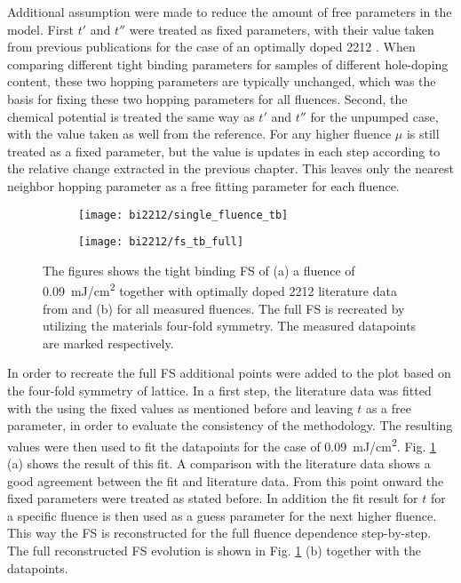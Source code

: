 Additional assumption were made to reduce the amount of free parameters in the model.
First $t'$ and $t''$ were treated as fixed parameters, with their value taken from previous publications for the case of an optimally doped 2212 \cite{}.
When comparing different tight binding parameters for samples of different hole-doping content, these two hopping parameters are typically unchanged, which was the basis for fixing these two hopping parameters for all fluences.
Second, the chemical potential is treated the same way as $t'$ and $t''$ for the unpumped case, with the value taken as well from the reference.
For any higher fluence $\mu$ is still treated as a fixed parameter, but the value is updates in each step according to the relative change extracted in the previous chapter.
This leaves only the nearest neighbor hopping parameter as a free fitting parameter for each fluence.

\begin{figure}[b!]
	\centering
	\begin{subfigure}[t!]{0.33\textwidth}
		\texttt{[image: bi2212/single\_fluence\_tb]}
		\caption{}
	\end{subfigure}
	\begin{subfigure}[t!]{0.33\textwidth}
		\texttt{[image: bi2212/fs\_tb\_full]}
		\caption{}
	\end{subfigure}
	\caption{The figures shows the tight binding FS of (a) a fluence of \qty{0.09}{\milli\joule/\centi\meter\squared} together with optimally doped 2212 literature data from \cite{} and (b) for all measured fluences. The full FS is recreated by utilizing the materials four-fold symmetry. The measured datapoints are marked respectively.}
	\label{fig:fs_tb}
\end{figure}

In order to recreate the full FS additional points were added to the plot based on the four-fold symmetry of lattice.
In a first step, the literature data was fitted with the using the fixed values as mentioned before and leaving $t$ as a free parameter, in order to evaluate the consistency of the methodology.
The resulting values were then used to fit the datapoints for the case of \qty{0.09}{\milli\joule/\centi\meter\squared}.
Fig. \ref{fig:fs_tb} (a) shows the result of this fit.
A comparison with the literature data shows a good agreement between the fit and literature data.
From this point onward the fixed parameters were treated as stated before.
In addition the fit result for $t$ for a specific fluence is then used as a guess parameter for the next higher fluence.
This way the FS is reconstructed for the full fluence dependence step-by-step.
The full reconstructed FS evolution is shown in Fig. \ref{fig:fs_tb} (b) together with the datapoints.

